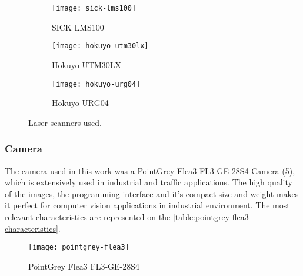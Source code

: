 \begin{figure}[h]
    
    \centering
    \begin{subfigure}{0.3\textwidth}
        \centering
        \texttt{[image: sick-lms100]}
        \caption{SICK LMS100}
        \label{fig:sick-lms100}
    \end{subfigure}%
    \begin{subfigure}{0.3\textwidth}
        \centering
        \texttt{[image: hokuyo-utm30lx]}
        \caption{Hokuyo UTM30LX}
        \label{fig:hokuyo-utm30lx}
    \end{subfigure}%
    \begin{subfigure}{0.3\textwidth}
        \centering
        \texttt{[image: hokuyo-urg04]}
        \caption{Hokuyo URG04}
        \label{fig:hokuyo-urg04}
    \end{subfigure}

    \caption{Laser scanners used.}
    \label{fig:laserscanners}

\end{figure}

\subsubsection{Camera}

The camera used in this work was a PointGrey Flea3 FL3-GE-28S4 Camera (\cref{fig:pointgrey-flea3}), which is extensively used in industrial and traffic applications. The high quality of the images, the programming interface and it's compact size and weight makes it perfect for computer vision applications in industrial environment. The most relevant characteristics are represented on the \cref{table:pointgrey-flea3-characteristics}.

\begin{figure}[h]
    \centering
    \texttt{[image: pointgrey-flea3]}
    \caption{PointGrey Flea3 FL3-GE-28S4}
    \label{fig:pointgrey-flea3}
\end{figure}

